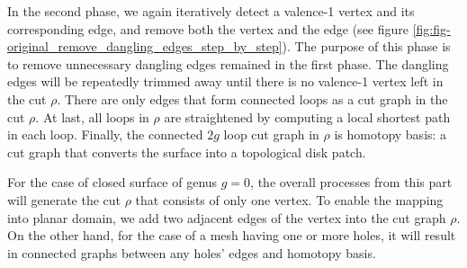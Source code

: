 \documentclass[a4paper,twoside]{article}
\begin{document}
In the second phase, we again iteratively detect a valence-1 vertex and its corresponding edge, and remove both the vertex and the edge (see figure \ref{fig:fig-original_remove_dangling_edges_step_by_step}). The purpose of this phase is to remove unnecessary dangling edges remained in the first phase. The dangling edges will be repeatedly trimmed away until there is no valence-1 vertex left in the cut $\rho$. There are only edges that form connected loops as a cut graph in the cut $\rho$. At last, all loops in $\rho$ are straightened by computing a local shortest path in each loop. Finally, the connected $2g$ loop cut graph in $\rho$ is homotopy basis: a cut graph that converts the surface into a topological disk patch. %

For the case of closed surface of genus $g=0$, the overall processes from this part will generate the cut $\rho$ that consists of only one vertex. To enable the mapping into planar domain, we add two adjacent edges of the vertex into the cut graph $\rho$. On the other hand, for the case of a mesh having one or more holes, it will result in connected graphs between any holes' edges and homotopy basis.
\end{document}
